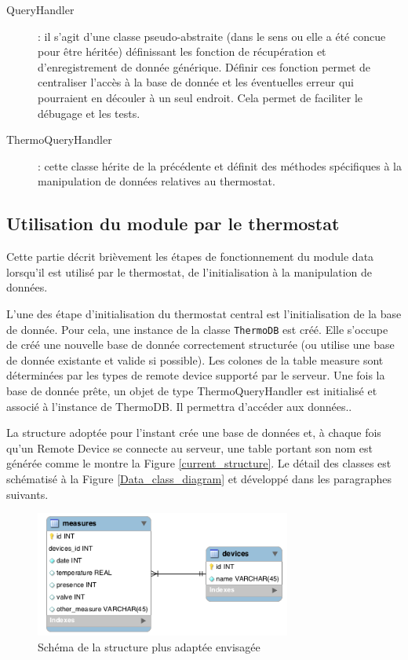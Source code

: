 \documentclass[11pt,a4paper,11pt]{report}
\begin{document}
\begin{description}
\item[QueryHandler]: il s'agit d'une classe pseudo-abstraite (dans le sens ou elle a été concue pour être héritée) définissant les fonction de récupération et d'enregistrement de donnée générique. Définir ces fonction permet de centraliser l'accès à la base de donnée et les éventuelles erreur qui pourraient en découler à un seul endroit. Cela permet de faciliter le débugage et les tests.
\end{description}

\begin{description}
\item[ThermoQueryHandler]: cette classe hérite de la précédente et définit des méthodes spécifiques à la manipulation de données relatives au thermostat. 

\end{description}

\subsection{Utilisation du module par le thermostat}
Cette partie décrit brièvement les étapes de fonctionnement du module data lorsqu'il est utilisé par le thermostat, de l'initialisation à la manipulation de données. %

L'une des étape d'initialisation du thermostat central est l'initialisation de la base de donnée. Pour cela, une instance de la classe \texttt{ThermoDB} est créé. Elle s'occupe de créé une nouvelle base de donnée correctement structurée (ou utilise une base de donnée existante et valide si possible). Les colones de la table measure sont déterminées par les types de remote device supporté par le serveur.%
Une fois la base de donnée prête, un objet de type ThermoQueryHandler est initialisé et associé à l'instance de ThermoDB. Il permettra d'accéder aux données..

La structure adoptée pour l'instant crée une base de données et, à chaque fois qu'un Remote Device se connecte au serveur, une table portant son nom est générée comme le montre la Figure \ref{current_structure}. Le détail des classes est schématisé à la Figure \ref{Data_class_diagram} et développé dans les paragraphes suivants.
   
\begin{figure}
\centering
\includegraphics[width=0.75\textwidth]{images/better_structure.png}
\caption{Schéma de la structure plus adaptée envisagée}
\label{Better_structure}
\end{figure}
\end{document}
